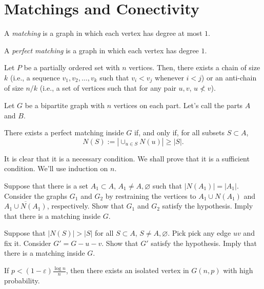 \newpage
\section{Matchings and Conectivity}

\begin{defn}[Matching]
	A \emph{matching} is a graph in which each vertex has degree at most $1$.

	A \emph{perfect matching} is a graph in which each vertex has degree $1$.
\end{defn}

\begin{thm}[Dilworth]
	Let $P$ be a partially ordered set with $n$ vertices. Then, there exists a chain of size $k$ (i.e., a sequence $v_1, v_2, \dots, v_k$ such that $v_i < v_j$ whenever $i < j$) or an anti-chain of size $n/k$ (i.e., a set of vertices such that for any pair $u, v$, $u \not< v$).
\end{thm}

\begin{thm}
	Let $G$ be a bipartite graph with $n$ vertices on each part. Let's call the parts $A$ and $B$.

	There exists a perfect matching inside $G$ if, and only if, for all subsets $S \subset A$, \[
		N(S) := \left|\cup_{u \in S}N(u)\right|	\ge |S|.
	\]
\end{thm}

\begin{sk}
	It is clear that it is a necessary condition. We shall prove that it is a sufficient condition. We'll use induction on $n$.

	Suppose that there is a set $A_1 \subset A$, $A_1 \neq A, \varnothing$ such that $|N(A_1)| = |A_1|$. Consider the graphs $G_1$ and $G_2$ by restraining the vertices to $A_1 \cup N(A_1)$ and $\overline{A_1 \cup N(A_1)}$, respectively. Show that $G_1$ and $G_2$ satisfy the hypothesis. Imply that there is a matching inside $G$.

	Suppose that $|N(S)| > |S|$ for all $S \subset A$, $S \neq A, \varnothing$. Pick pick any edge $uv$ and fix it. Consider  $G' = G - u - v$. Show that $G'$ satisfy the hypothesis. Imply that there is a matching inside $G$.
\end{sk}

\begin{prop} \label{prop:isolatedvertex}
	If $p < (1-\varepsilon)\frac{\log n}{n}$, then there exists an isolated vertex in $G(n, p)$ with high probability.
\end{prop}

